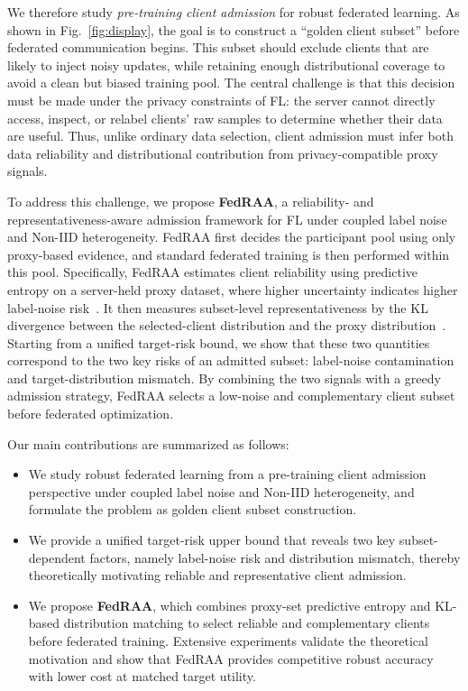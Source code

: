 \documentclass[conference]{IEEEtran}
\theoremstyle{definition}
\theoremstyle{remark}
\begin{document}
We therefore study \emph{pre-training client admission} for robust federated learning.
As shown in Fig.~\ref{fig:display}, the goal is to construct a ``golden client subset'' before federated communication begins.
This subset should exclude clients that are likely to inject noisy updates, while retaining enough distributional coverage to avoid a clean but biased training pool.
The central challenge is that this decision must be made under the privacy constraints of FL: the server cannot directly access, inspect, or relabel clients' raw samples to determine whether their data are useful.
Thus, unlike ordinary data selection, client admission must infer both data reliability and distributional contribution from privacy-compatible proxy signals.

To address this challenge, we propose \textbf{FedRAA}, a reliability- and representativeness-aware admission framework for FL under coupled label noise and Non-IID heterogeneity.
FedRAA first decides the participant pool using only proxy-based evidence, and standard federated training is then performed within this pool.
Specifically, FedRAA estimates client reliability using predictive entropy on a server-held proxy dataset, where higher uncertainty indicates higher label-noise risk~\cite{natarajan2013learning,tsouvalas2022labeling}.
It then measures subset-level representativeness by the KL divergence between the selected-client distribution and the proxy distribution~\cite{ben2010theory,hsu2019measuring,zhu2021survey,zhang2023dpp}.
Starting from a unified target-risk bound, we show that these two quantities correspond to the two key risks of an admitted subset: label-noise contamination and target-distribution mismatch.
By combining the two signals with a greedy admission strategy, FedRAA selects a low-noise and complementary client subset before federated optimization.

Our main contributions are summarized as follows:
\begin{itemize}
    \item We study robust federated learning from a pre-training client admission perspective under coupled label noise and Non-IID heterogeneity, and formulate the problem as golden client subset construction.

    \item We provide a unified target-risk upper bound that reveals two key subset-dependent factors, namely label-noise risk and distribution mismatch, thereby theoretically motivating reliable and representative client admission.

    \item We propose \textbf{FedRAA}, which combines proxy-set predictive entropy and KL-based distribution matching to select reliable and complementary clients before federated training. 
    Extensive experiments validate the theoretical motivation and show that FedRAA provides competitive robust accuracy with lower cost at matched target utility.
\end{itemize}
\end{document}
